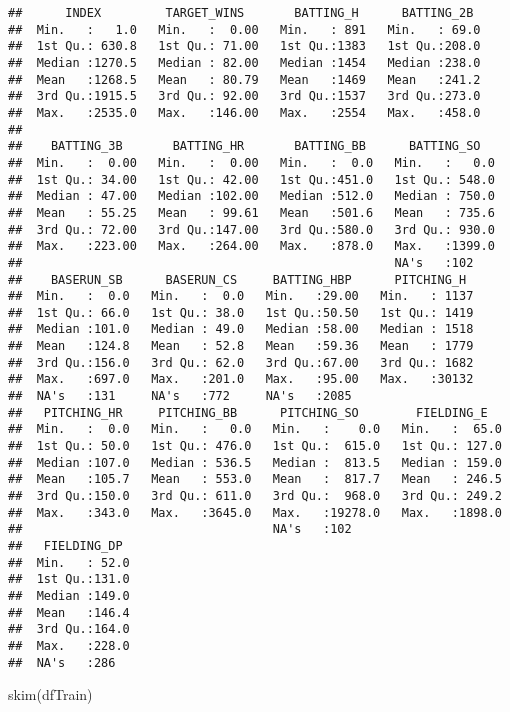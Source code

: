 \documentclass[
]{article}
\newenvironment{Shaded}{\begin{snugshade}}{\end{snugshade}}
\newcommand{\FunctionTok}[1]{\textcolor[rgb]{0.00,0.00,0.00}{#1}}
\newcommand{\NormalTok}[1]{#1}
\begin{document}
\begin{verbatim}
##      INDEX         TARGET_WINS       BATTING_H      BATTING_2B   
##  Min.   :   1.0   Min.   :  0.00   Min.   : 891   Min.   : 69.0  
##  1st Qu.: 630.8   1st Qu.: 71.00   1st Qu.:1383   1st Qu.:208.0  
##  Median :1270.5   Median : 82.00   Median :1454   Median :238.0  
##  Mean   :1268.5   Mean   : 80.79   Mean   :1469   Mean   :241.2  
##  3rd Qu.:1915.5   3rd Qu.: 92.00   3rd Qu.:1537   3rd Qu.:273.0  
##  Max.   :2535.0   Max.   :146.00   Max.   :2554   Max.   :458.0  
##                                                                  
##    BATTING_3B       BATTING_HR       BATTING_BB      BATTING_SO    
##  Min.   :  0.00   Min.   :  0.00   Min.   :  0.0   Min.   :   0.0  
##  1st Qu.: 34.00   1st Qu.: 42.00   1st Qu.:451.0   1st Qu.: 548.0  
##  Median : 47.00   Median :102.00   Median :512.0   Median : 750.0  
##  Mean   : 55.25   Mean   : 99.61   Mean   :501.6   Mean   : 735.6  
##  3rd Qu.: 72.00   3rd Qu.:147.00   3rd Qu.:580.0   3rd Qu.: 930.0  
##  Max.   :223.00   Max.   :264.00   Max.   :878.0   Max.   :1399.0  
##                                                    NA's   :102     
##    BASERUN_SB      BASERUN_CS     BATTING_HBP      PITCHING_H   
##  Min.   :  0.0   Min.   :  0.0   Min.   :29.00   Min.   : 1137  
##  1st Qu.: 66.0   1st Qu.: 38.0   1st Qu.:50.50   1st Qu.: 1419  
##  Median :101.0   Median : 49.0   Median :58.00   Median : 1518  
##  Mean   :124.8   Mean   : 52.8   Mean   :59.36   Mean   : 1779  
##  3rd Qu.:156.0   3rd Qu.: 62.0   3rd Qu.:67.00   3rd Qu.: 1682  
##  Max.   :697.0   Max.   :201.0   Max.   :95.00   Max.   :30132  
##  NA's   :131     NA's   :772     NA's   :2085                   
##   PITCHING_HR     PITCHING_BB      PITCHING_SO        FIELDING_E    
##  Min.   :  0.0   Min.   :   0.0   Min.   :    0.0   Min.   :  65.0  
##  1st Qu.: 50.0   1st Qu.: 476.0   1st Qu.:  615.0   1st Qu.: 127.0  
##  Median :107.0   Median : 536.5   Median :  813.5   Median : 159.0  
##  Mean   :105.7   Mean   : 553.0   Mean   :  817.7   Mean   : 246.5  
##  3rd Qu.:150.0   3rd Qu.: 611.0   3rd Qu.:  968.0   3rd Qu.: 249.2  
##  Max.   :343.0   Max.   :3645.0   Max.   :19278.0   Max.   :1898.0  
##                                   NA's   :102                       
##   FIELDING_DP   
##  Min.   : 52.0  
##  1st Qu.:131.0  
##  Median :149.0  
##  Mean   :146.4  
##  3rd Qu.:164.0  
##  Max.   :228.0  
##  NA's   :286
\end{verbatim}

\begin{Shaded}
\begin{Highlighting}[]
\FunctionTok{skim}\NormalTok{(dfTrain)}
\end{Highlighting}
\end{Shaded}
\end{document}
